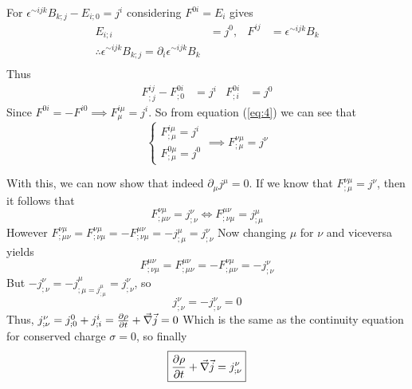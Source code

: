\documentclass{article}
\begin{document}
 	For $\epsilon^{\sim ijk} B_{k;j} - E_{i;0} = j^i$ considering $F^{0i} = E_i$ gives
 	\begin{align}
 		\label{eq:3} \nonumber
 		E_{i;i} &= j^0, & F^{ij} &= \epsilon^{\sim ijk} B_{k} \\
 		\therefore  \epsilon^{\sim ijk} B_{k;j} = \partial_i \epsilon^{\sim ijk} B_{k} \\
 	\end{align}
 	Thus
 	\begin{align}
 		\label{eq:4}
 		F_{;j}^{ij} - F_{;0}^{0i} &= j^i & F_{;i}^{0i} &= j^0
 	\end{align}
 	Since $F^{0i} = -F^{i0} \implies F_{\mu}^{i\mu} = j^i$. So from equation (\ref{eq:4}) we can see that
 	\begin{equation}
 		\label{eq:5}
 		\begin{cases}
 			F^{i\mu}_{;\mu} = j^i \\
 			F^{0\mu}_{;\mu} = j^0
 		\end{cases} \implies
 		F^{\nu\mu}_{;\mu} = j^\nu
 	\end{equation}
 	
 	With this, we can now show that indeed $\partial_\mu j^\mu = 0$. If we know that $F_{;\mu}^{\nu\mu} = j^\nu$, then it follows that
 	$$ F_{;\mu\nu}^{\nu\mu} = j^\nu_{;\nu} \iff F^{\mu\nu}_{;\nu\mu} = j^\mu_{;\mu}$$
 	However $F_{;\mu\nu}^{\nu\mu} =  F^{\nu\mu}_{;\nu\mu} = -F_{;\nu\mu}^{\mu\nu} = -j^\mu_{;\mu} = j_{;\nu}^\nu$
 	Now changing $\mu$ for $\nu$ and viceversa yields
 	$$F_{;\nu\mu}^{\mu\nu} =  F^{\mu\nu}_{;\mu\nu} = -F_{;\mu\nu}^{\nu\mu} = -j^\nu_{;\nu}$$
 	But $- j^{\nu}_{;\nu}=-j^{\mu}_{;\mu = j^{\mu}_{;\mu}} = j^{\nu}_{;\nu}$, so
 	$$ j^{\nu}_{;\nu} = - j^{\nu}_{;\nu} = 0$$
 	Thus, $j^{\nu}_{;\nu} = j^{0}_{;0} + j^{i}_{;i} = \frac{\partial \rho}{\partial t} + \vec{\nabla} \vec{j} = 0$  
 	Which is the same as the continuity equation for conserved charge $\sigma=0$, so finally
 	\begin{equation}
 		\label{ans:1a}
 		\boxed{\frac{\partial \rho}{\partial t} + \vec{\nabla} \vec{j} = j_{;\nu}^\nu}
 	\end{equation}
 
 	\pagebreak
\end{document}

